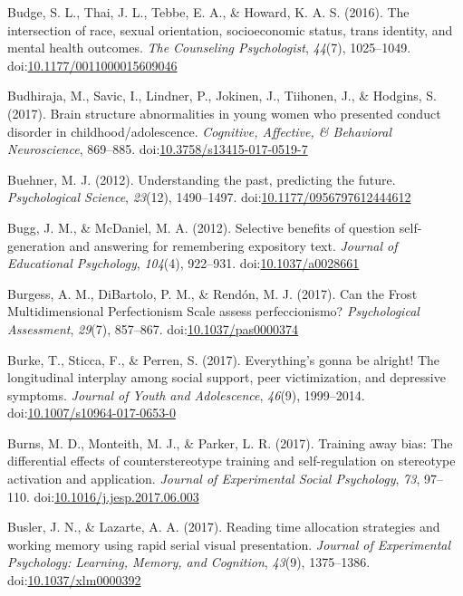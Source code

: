 \documentclass[english,man]{apa6}
\theoremstyle{definition}
\theoremstyle{definition}
\theoremstyle{definition}
\theoremstyle{remark}
\begin{document}
\hypertarget{ref-Budge2016}{}
Budge, S. L., Thai, J. L., Tebbe, E. A., \& Howard, K. A. S. (2016). The
intersection of race, sexual orientation, socioeconomic status, trans
identity, and mental health outcomes. \emph{The Counseling
Psychologist}, \emph{44}(7), 1025--1049.
doi:\href{https://doi.org/10.1177/0011000015609046}{10.1177/0011000015609046}

\hypertarget{ref-Budhiraja2017}{}
Budhiraja, M., Savic, I., Lindner, P., Jokinen, J., Tiihonen, J., \&
Hodgins, S. (2017). Brain structure abnormalities in young women who
presented conduct disorder in childhood/adolescence. \emph{Cognitive,
Affective, \& Behavioral Neuroscience}, 869--885.
doi:\href{https://doi.org/10.3758/s13415-017-0519-7}{10.3758/s13415-017-0519-7}

\hypertarget{ref-Buehner2012}{}
Buehner, M. J. (2012). Understanding the past, predicting the future.
\emph{Psychological Science}, \emph{23}(12), 1490--1497.
doi:\href{https://doi.org/10.1177/0956797612444612}{10.1177/0956797612444612}

\hypertarget{ref-Bugg2012}{}
Bugg, J. M., \& McDaniel, M. A. (2012). Selective benefits of question
self-generation and answering for remembering expository text.
\emph{Journal of Educational Psychology}, \emph{104}(4), 922--931.
doi:\href{https://doi.org/10.1037/a0028661}{10.1037/a0028661}

\hypertarget{ref-Burgess2017}{}
Burgess, A. M., DiBartolo, P. M., \& Rendón, M. J. (2017). Can the Frost
Multidimensional Perfectionism Scale assess perfeccionismo?
\emph{Psychological Assessment}, \emph{29}(7), 857--867.
doi:\href{https://doi.org/10.1037/pas0000374}{10.1037/pas0000374}

\hypertarget{ref-Burke2017}{}
Burke, T., Sticca, F., \& Perren, S. (2017). Everything's gonna be
alright! The longitudinal interplay among social support, peer
victimization, and depressive symptoms. \emph{Journal of Youth and
Adolescence}, \emph{46}(9), 1999--2014.
doi:\href{https://doi.org/10.1007/s10964-017-0653-0}{10.1007/s10964-017-0653-0}

\hypertarget{ref-Burns2017}{}
Burns, M. D., Monteith, M. J., \& Parker, L. R. (2017). Training away
bias: The differential effects of counterstereotype training and
self-regulation on stereotype activation and application. \emph{Journal
of Experimental Social Psychology}, \emph{73}, 97--110.
doi:\href{https://doi.org/10.1016/j.jesp.2017.06.003}{10.1016/j.jesp.2017.06.003}

\hypertarget{ref-Busler2017}{}
Busler, J. N., \& Lazarte, A. A. (2017). Reading time allocation
strategies and working memory using rapid serial visual presentation.
\emph{Journal of Experimental Psychology: Learning, Memory, and
Cognition}, \emph{43}(9), 1375--1386.
doi:\href{https://doi.org/10.1037/xlm0000392}{10.1037/xlm0000392}
\end{document}
